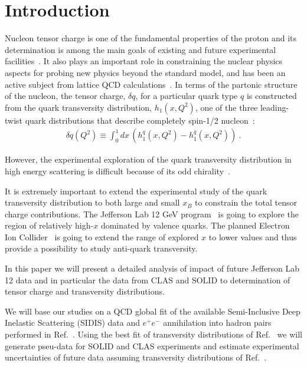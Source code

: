 \documentclass[twocolumn,showpacs,preprintnumbers,amsmath,amssymb,floatfix,prd]{revtex4}
\begin{document}
\section{Introduction}
%
Nucleon tensor charge is one of the fundamental properties
of the proton and its determination is among the main goals of
existing and future experimental facilities~\cite{Ralston:1979ys,Jaffe:1991kp,
Barone:2001sp,Dudek:2012vr,Boer:2011fh,Accardi:2012qut}.
It also plays an important role in constraining the nuclear physics aspects for
probing new physics beyond the standard model,
and has been an active subject from lattice QCD calculations~\cite{Bhattacharya:2011qm,Green:2012ej}.
In terms of the partonic structure of the nucleon, the tensor charge, $\delta q$, for a particular quark type $q$ 
is constructed from the quark transversity distribution, $h_1(x,Q^2)$,
one of the three leading-twist quark distributions that describe completely
spin-1/2 nucleon~\cite{Ralston:1979ys,Jaffe:1991kp,Barone:2001sp,Boer:2011fh}:
\begin{eqnarray}
\delta q \left(Q^2\right) \equiv   \int_{0}^{1}dx \, \left(h_1^q(x,Q^2) - h_1^{\bar q}(x,Q^2)\right)
 \ .
\end{eqnarray}


However, the experimental exploration of the quark
transversity distribution in high energy scattering is difficult
because of its odd chirality~\cite{Jaffe:1991kp}.

It is extremely important to extend the experimental study of the quark transversity
distribution to both large and small $x_B$ to constrain the total tensor charge
contributions.
The Jefferson Lab 12 GeV program~\cite{Dudek:2012vr}  is going to explore the region of relatively high-$x$ dominated by valence quarks. The planned
Electron Ion Collider~\cite{Boer:2011fh,Accardi:2012qut,Aschenauer:2014twa} is going to extend the range of explored $x$ to lower values and thus provide a possibility to study anti-quark transversity.

In this paper we will present a detailed analysis of impact of future Jefferson Lab 12 data and in particular the data from CLAS and SOLID to determination of tensor charge and transversity distributions.

We will base our studies on a QCD global fit of the available Semi-Inclusive Deep Inelastic Scattering (SIDIS) data and $e^+e^-$ annihilation into hadron pairs performed in Ref.~\cite{Kang:2015msa}. Using the best fit of transversity distributions of Ref.~\cite{Kang:2015msa} we will generate pseu-data for SOLID and CLAS experiments and estimate experimental uncertainties of future data assuming transversity distributions of Ref.~\cite{Kang:2015msa}.
\end{document}
